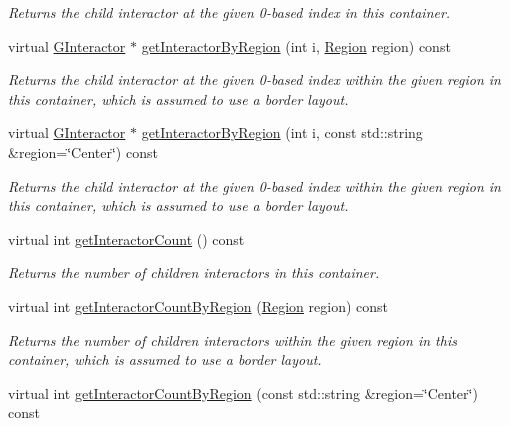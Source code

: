 \begin{DoxyCompactItemize}
\begin{DoxyCompactList}\small\item\em Returns the child interactor at the given 0-\/based index in this container. \end{DoxyCompactList}\item 
virtual \mbox{\hyperlink{classGInteractor}{G\+Interactor}} $\ast$ \mbox{\hyperlink{classGContainer_ad31230cd6d220466fbd18fd21d133f67}{get\+Interactor\+By\+Region}} (int i, \mbox{\hyperlink{classGContainer_a81a01a86de31071a92e6cce0bab9bc4b}{Region}} region) const
\begin{DoxyCompactList}\small\item\em Returns the child interactor at the given 0-\/based index within the given region in this container, which is assumed to use a border layout. \end{DoxyCompactList}\item 
virtual \mbox{\hyperlink{classGInteractor}{G\+Interactor}} $\ast$ \mbox{\hyperlink{classGContainer_a576bbbb845c9bcf139fca956e3a4c757}{get\+Interactor\+By\+Region}} (int i, const std\+::string \&region=\char`\"{}Center\char`\"{}) const
\begin{DoxyCompactList}\small\item\em Returns the child interactor at the given 0-\/based index within the given region in this container, which is assumed to use a border layout. \end{DoxyCompactList}\item 
virtual int \mbox{\hyperlink{classGContainer_a789affbf8e89e65e3afd63cc626f5a81}{get\+Interactor\+Count}} () const
\begin{DoxyCompactList}\small\item\em Returns the number of children interactors in this container. \end{DoxyCompactList}\item 
virtual int \mbox{\hyperlink{classGContainer_a668fe9a4efc31fa065ded79c0e5eab64}{get\+Interactor\+Count\+By\+Region}} (\mbox{\hyperlink{classGContainer_a81a01a86de31071a92e6cce0bab9bc4b}{Region}} region) const
\begin{DoxyCompactList}\small\item\em Returns the number of children interactors within the given region in this container, which is assumed to use a border layout. \end{DoxyCompactList}\item 
virtual int \mbox{\hyperlink{classGContainer_ab51dbb723159efca4fc89e2c4211610c}{get\+Interactor\+Count\+By\+Region}} (const std\+::string \&region=\char`\"{}Center\char`\"{}) const

\end{DoxyCompactItemize}
